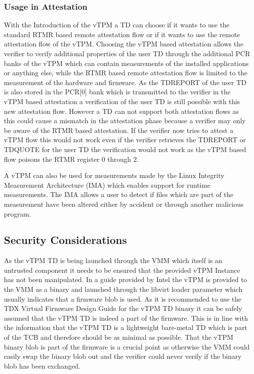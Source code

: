 \documentclass[sigplan,screen,nonacm]{acmart}
\begin{document}
\subsubsection{Usage in Attestation}
With the Introduction of the vTPM a TD can choose if it wants to use the standard RTMR based remote attestation flow or if it wants to use the remote attestation flow of the vTPM.
Choosing the vTPM based attestation allows the verifier to verify additional properties of the user TD through the additional PCR banks of the vTPM which can contain measurements of the installed applications or anything else, while the RTMR based remote attestation flow is limited to the measurement of the hardware and firmware.
As the TDREPORT of the user TD is also stored in the PCR[0] bank which is transmitted to the verifier in the vTPM based attestation a verification of the user TD is still possible with this new attestation flow.
However a TD can not support both attestation flows as this could cause a mismatch in the attestation phase because a verifier may only be aware of the RTMR based attestation.
If the verifier now tries to attest a vTPM flow this would not work even if the verifier retrieves the TDREPORT or TDQUOTE for the user TD the verification would not work as the vTPM based flow poisons the RTMR register 0 through 2.

A vTPM can also be used for measurements made by the Linux Integrity Measurement Architecture (IMA) which enables support for runtime measurements\cite{Intel-IMA}.
The IMA allows a user to detect if files which are part of the measurement have been altered either by accident or through another malicious program.

\subsection{Security Considerations}
As the vTPM TD is being launched through the VMM which itself is an untrusted component it needs to be ensured that the provided vTPM Instance has not been manipulated.
In a guide provided by Intel the vTPM is provided to the VMM as a binary and launched through the libvirt loader parameter which usually indicates that a firmware blob is used\cite[p. 84]{Intel-linux-tdx}\cite{libvirt}.
As it is recommended to use the TDX Virtual Firmware Design Guide for the vTPM TD binary it can be safely assumed that the vTPM TD is indeed a part of the firmware\cite[p. 20]{Intel-vTPM}.
This is in line with the information that the vTPM TD is a lightweight bare-metal TD which is part of the TCB and therefore should be as minimal as possible\cite[p. 18]{Intel-vTPM}.
That the vTPM binary blob is part of the firmware is a crucial point as otherwise the VMM could easily swap the binary blob out and the verifier could never verify if the binary blob has been exchanged.
\end{document}
